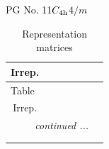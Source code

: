 \documentclass[fleqn,8pt,landscape]{jsarticle}
\begin{document}
\setcounter{MaxMatrixCols}{32}

\renewcommand{\tablename}{Table~}
\renewcommand{\figurename}{Figure~}
\begin{center}
\LARGE
PG No. 11\quad$C_{\rm 4h}$\quad$4/m$\quad[ tetragonal ]
\end{center}
\renewcommand{\arraystretch}{1.2}
\begin{longtable}{ccccccc}
\caption{Representation matrices}
 \\
 \hline \hline
Irrep. &  &  &  &  &  &  \\ \hline \endfirsthead

\multicolumn{6}{l}{\tablename\ \thetable{}} \\
 \hline \hline
Irrep. &  &  &  &  &  &  \\ \hline \endhead

 \hline \hline
\multicolumn{6}{r}{\footnotesize\it continued ...} \\ \endfoot

 \hline \hline
\multicolumn{6}{r}{} \\ \endlastfoot


\end{longtable}
\end{document}
